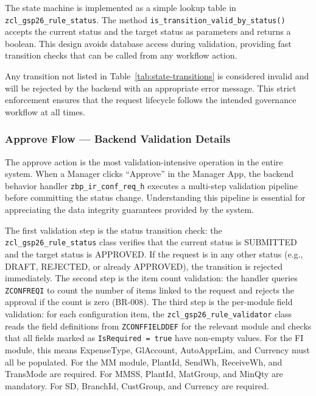 \documentclass[12pt,a4paper]{report}
\begin{document}
The state machine is implemented as a simple lookup table in \texttt{zcl\_gsp26\_rule\_status}. The method \texttt{is\_transition\_valid\_by\_status()} accepts the current status and the target status as parameters and returns a boolean. This design avoids database access during validation, providing fast transition checks that can be called from any workflow action.

Any transition not listed in Table~\ref{tab:state-transitions} is considered invalid and will be rejected by the backend with an appropriate error message. This strict enforcement ensures that the request lifecycle follows the intended governance workflow at all times.

\subsubsection{Approve Flow --- Backend Validation Details}

The approve action is the most validation-intensive operation in the entire system. When a Manager clicks ``Approve'' in the Manager App, the backend behavior handler \texttt{zbp\_ir\_conf\_req\_h} executes a multi-step validation pipeline before committing the status change. Understanding this pipeline is essential for appreciating the data integrity guarantees provided by the system.

The first validation step is the status transition check: the \texttt{zcl\_gsp26\_rule\_status} class verifies that the current status is SUBMITTED and the target status is APPROVED. If the request is in any other status (e.g., DRAFT, REJECTED, or already APPROVED), the transition is rejected immediately. The second step is the item count validation: the handler queries \texttt{ZCONFREQI} to count the number of items linked to the request and rejects the approval if the count is zero (BR-008). The third step is the per-module field validation: for each configuration item, the \texttt{zcl\_gsp26\_rule\_validator} class reads the field definitions from \texttt{ZCONFFIELDDEF} for the relevant module and checks that all fields marked as \texttt{IsRequired = true} have non-empty values. For the FI module, this means ExpenseType, GlAccount, AutoApprLim, and Currency must all be populated. For the MM module, PlantId, SendWh, ReceiveWh, and TransMode are required. For MMSS, PlantId, MatGroup, and MinQty are mandatory. For SD, BranchId, CustGroup, and Currency are required.
\end{document}

